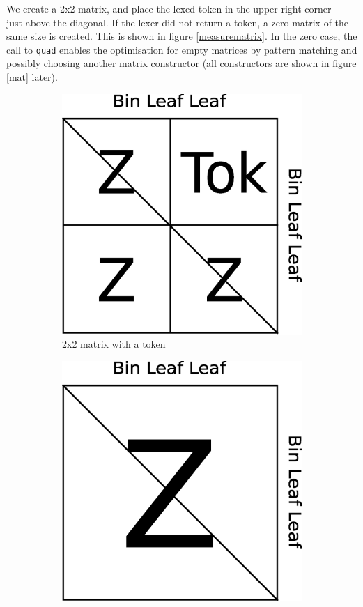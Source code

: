 \documentclass[a4paper,12pt,twosided]{report}
\begin{document}
We create a 2x2 matrix, and place the lexed token in the upper-right corner
-- just above the diagonal. If the lexer did not return a token, a zero matrix
of the same size is created. This is shown in figure \ref{measurematrix}. In the
zero case, the call to \texttt{quad} enables the optimisation for empty matrices
by pattern matching and possibly choosing another matrix constructor (all
constructors are shown in figure \ref{mat} later).

\begin{figure}[H]
\centering
\begin{subfigure}[H]{.4\textwidth}
\includegraphics[width=.9\textwidth]{matrix2x2-token.eps}
\caption{2x2 matrix with a token}
\end{subfigure}
\begin{subfigure}[H]{.4\textwidth}
\includegraphics[width=.9\textwidth]{matrix2x2-zero.eps}

\end{subfigure}
\end{figure}
\end{document}
